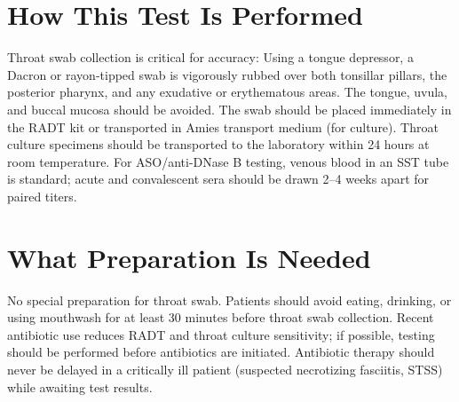 \section*{How This Test Is Performed}
Throat swab collection is critical for accuracy: Using a tongue depressor, a Dacron or rayon-tipped swab is vigorously rubbed over both tonsillar pillars, the posterior pharynx, and any exudative or erythematous areas. The tongue, uvula, and buccal mucosa should be avoided. The swab should be placed immediately in the RADT kit or transported in Amies transport medium (for culture). Throat culture specimens should be transported to the laboratory within 24 hours at room temperature. For ASO/anti-DNase B testing, venous blood in an SST tube is standard; acute and convalescent sera should be drawn 2--4 weeks apart for paired titers.

\section*{What Preparation Is Needed}
No special preparation for throat swab. Patients should avoid eating, drinking, or using mouthwash for at least 30 minutes before throat swab collection. Recent antibiotic use reduces RADT and throat culture sensitivity; if possible, testing should be performed before antibiotics are initiated. Antibiotic therapy should never be delayed in a critically ill patient (suspected necrotizing fasciitis, STSS) while awaiting test results.

